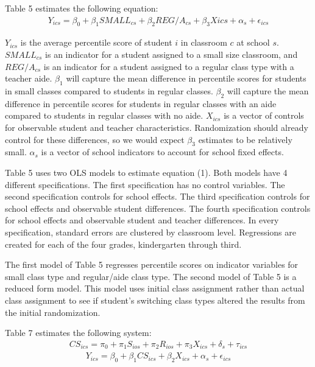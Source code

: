 \documentclass[a4paper,11pt]{article}
\begin{document}
Table 5 estimates the following equation: 
\begin{align}
 Y_{ics} = \beta_{0} + \beta_{1}SMALL_{cs} + \beta_{2}REG/A_{cs} + \beta_{3}X{ics} + \alpha_{s} + \epsilon_{ics}
\end{align}

$Y_{ics}$ is the average percentile score of student $i$ in classroom $c$ at school $s$. $SMALL_{cs}$ is an indicator for a student assigned to a small size classroom, and $REG/A_{cs}$ is an indicator for a student assigned to a regular class type with a teacher aide.  $\beta_{1}$ will capture the mean difference in percentile scores for students in small classes compared to students in regular classes. $\beta_{2}$ will capture the mean difference in percentile scores for students in regular classes with an aide compared to students in regular classes with no aide. $X_{ics}$ is a vector of controls for observable student and teacher characteristics. Randomization should already control for these differences, so we would expect $\beta_{3}$ estimates to be relatively small. $\alpha_{s}$ is a vector of school indicators to account for school fixed effects. \par

Table 5 uses two OLS models to estimate equation (1). Both models have 4 different specifications. The first specification has no control variables. The second specification controls for school effects. The third specification controls for school effects and observable student differences. The fourth specification controls for school effects and observable student and teacher differences. In every specification, standard errors are clustered by classroom level. Regressions are created for each of the four grades, kindergarten through third. \par

The first model of Table 5 regresses percentile scores on indicator variables for small class type and regular/aide class type.  The second model of Table 5 is a reduced form model. This model uses initial class assignment rather than actual class assignment to see if student's switching class types altered the results from the initial randomization. \par

Table 7 estimates the following system:
\begin{align}
CS_{ics} = \pi_{0} + \pi_{1}S_{ios} + \pi_{2}R_{ios} + \pi_{3}X_{ics} + \delta_{s} + \tau_{ics}
\end{align}
\begin{align}
Y_{ics} = \beta_{0} + \beta_{1}CS_{ics} + \beta_{2}X_{ics} + \alpha_{s} + \epsilon_{ics}
\end{align}
\end{document}
